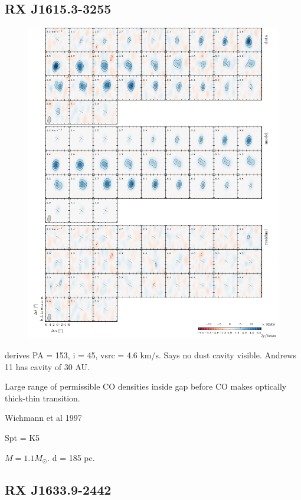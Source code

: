 \documentclass[twocolumn]{aastex6}
\begin{document}
\subsection{RX J1615.3-3255}
\begin{figure}[htb]
\begin{center}
  \includegraphics{RXJ1615.pdf}
  \end{center}
\end{figure}

\citep{vandermarel15} derives PA = 153, i = 45, vsrc = 4.6 km/s. Says no dust cavity visible. Andrews 11 has cavity of 30 AU.

Large range of permissible CO densities inside gap before CO makes optically thick-thin transition.

\citep{andrews11}
Wichmann et al 1997

Spt = K5

$M = 1.1 M_\odot$.
d = 185 pc.

\subsection{RX J1633.9-2442}
\end{document}
